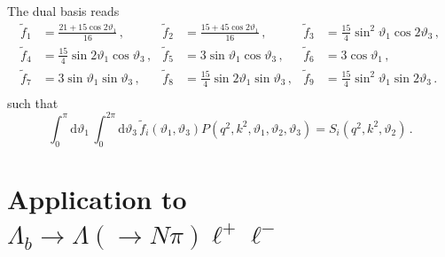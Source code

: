 \documentclass[aps,prd,reprint,nofootinbib,preprintnumbers]{revtex4}
\newcommand{\dual}[1]{\tilde{#1}}
\newcommand{\rmdx}[1]{\mbox{d} #1 \,} %
\renewcommand{\theta}{\vartheta}
\begin{document}
The dual basis reads
\begin{equation}
\begin{aligned}
    \dual{f}_1 & = \frac{21 + 15 \cos 2\theta_1}{16}\,, &
    \dual{f}_2 & = \frac{15 + 45 \cos 2\theta_1}{16}\,, &
    \dual{f}_3 & = \frac{15}{4} \sin^2\theta_1 \cos 2\theta_3     \,,\\
    \dual{f}_4 & = \frac{15}{4} \sin 2\theta_1 \cos  \theta_3     \,, &
    \dual{f}_5 & = 3            \sin  \theta_1 \cos  \theta_3     \,, &
    \dual{f}_6 & = 3 \cos\theta_1                   \,,\\
    \dual{f}_7 & = 3            \sin  \theta_1 \sin  \theta_3     \,, &
    \dual{f}_8 & = \frac{15}{4} \sin 2\theta_1 \sin  \theta_3     \,, &
    \dual{f}_9 & = \frac{15}{4} \sin^2\theta_1 \sin 2\theta_3     \,.\\
\end{aligned}
\end{equation}
such that
\begin{equation}
    \int_0^\pi \rmdx{\theta_1} \int_0^{2\pi} \rmdx{\theta_3} \dual{f}_i(\theta_1,\theta_3) P(q^2, k^2, \theta_1,\theta_2,\theta_3) = S_i(q^2, k^2, \theta_2)\,.
\end{equation}


\section{Application to $\Lambda_b\to \Lambda(\to N \pi)\ell^+\ell^-$}
\label{app:lambdabtolambdall}
\end{document}
